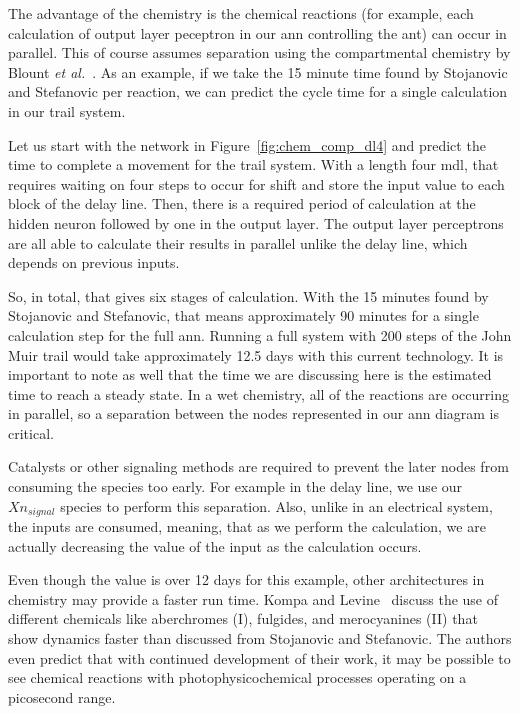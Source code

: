 The advantage of the chemistry is the chemical reactions (for example, each calculation of output layer peceptron in our \gls{ann} controlling the ant) can occur in parallel. This of course assumes separation using the compartmental chemistry by Blount \textit{et al.}~\cite{Blount_undated-ro}. As an example, if we take the 15 minute time found by Stojanovic and Stefanovic per reaction, we can predict the cycle time for a single calculation in our trail system.

Let us start with the network in Figure~\ref{fig:chem_comp_dl4} and predict the time to complete a movement for the trail system. With a length four \gls{mdl}, that requires waiting on four steps to occur for shift and store the input value to each block of the delay line. Then, there is a required period of calculation at the hidden neuron followed by one in the output layer. The output layer perceptrons are all able to calculate their results in parallel unlike the delay line, which depends on previous inputs. 

So, in total, that gives six stages of calculation. With the 15 minutes found by Stojanovic and Stefanovic, that means approximately 90 minutes for a single calculation step for the full \gls{ann}. Running a full system with 200 steps of the John Muir trail would take approximately 12.5 days with this current technology. It is important to note as well that the time we are discussing here is the estimated time to reach a steady state. In a wet chemistry, all of the reactions are occurring in parallel, so a separation between the nodes represented in our \gls{ann} diagram is critical. 

Catalysts or other signaling methods are required to prevent the later nodes from consuming the species too early. For example in the delay line, we use our $Xn_{signal}$ species to perform this separation. Also, unlike in an electrical system, the inputs are consumed, meaning, that as we perform the calculation, we are actually decreasing the value of the input as the calculation occurs. 

Even though the value is over 12 days for this example, other architectures in chemistry may provide a faster run time. Kompa and Levine~\cite{Kompa2001-yk} discuss the use of different chemicals like aberchromes (I), fulgides, and merocyanines (II) that show dynamics faster than discussed from Stojanovic and Stefanovic. The authors even predict that with continued development of their work, it may be possible to see chemical reactions with photophysicochemical processes operating on a picosecond range.